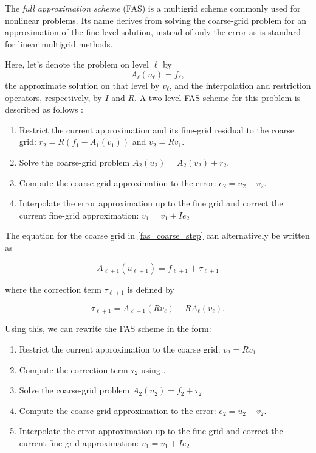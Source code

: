 The \textit{full approximation scheme} (FAS) is a multigrid scheme commonly used for nonlinear problems. Its name derives from solving the coarse-grid problem for an approximation of the fine-level solution, instead of only the error as is standard for linear multigrid methods. 

Here, let's denote the problem on level \(\ell\) by
\begin{equation}
    A_\ell(u_\ell)=f_\ell,
    \label{eq:fas_l_eq}
\end{equation}
the approximate solution on that level by \(v_\ell\), and the interpolation and restriction operators, respectively, by \(I\) and \(R\). A two level FAS scheme for this problem is described as follows \cite{briggs2000multigrid}:

\begin{enumerate}
    \item Restrict the current approximation and its fine-grid residual to the coarse grid: \(r_2 = R(f_1 - A_1(v_1))\) and \(v_2 = R v_1\).
    \item \label{fas_coarse_step} Solve the coarse-grid problem \(A_2(u_2) = A_2(v_2) + r_2\).
    \item Compute the coarse-grid approximation to the error: \(e_2 = u_2 - v_2\).
    \item Interpolate the error approximation up to the fine grid and correct the current fine-grid approximation: \(v_1 = v_1 + Ie_2\)
\end{enumerate}

The equation for the coarse grid in \ref{fas_coarse_step} can alternatively be written as

\begin{equation}
    A_{\ell+1}(u_{\ell+1})=f_{\ell+1}+\tau_{\ell+1}
    \label{eq:fas_lp1_eq}
\end{equation}

where the correction term \(\tau_{\ell+1}\) is defined by

\begin{equation}
    \tau_{\ell+1}=A_{\ell+1}(Rv_{\ell})-RA_\ell(v_\ell).
    \label{eq:fas_tau}
\end{equation}

Using this, we can rewrite the FAS scheme in the form:

\begin{enumerate}
    \item Restrict the current approximation to the coarse grid: \(v_2 = R v_1\)
    \item Compute the correction term \(\tau_2\) using .
    \item Solve the coarse-grid problem \(A_2(u_2)=f_2+\tau_2\)
    \item Compute the coarse-grid approximation to the error: \(e_2 = u_2 - v_2\).
    \item Interpolate the error approximation up to the fine grid and correct the current fine-grid approximation: \(v_1 = v_1 + Ie_2\)
\end{enumerate}

